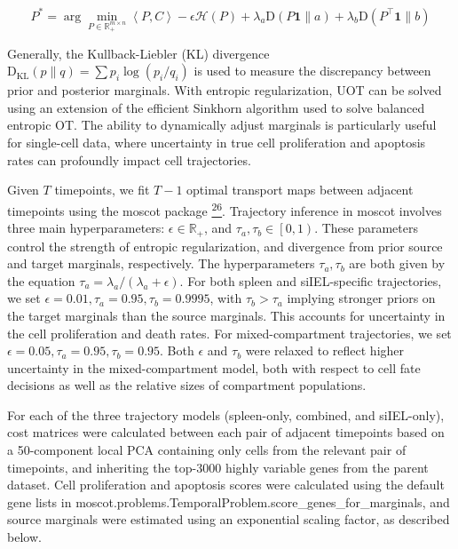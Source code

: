 \[P^{*} = \mathrm{\arg}\underset{P \in \mathbb{R}_{+}^{m \times n}}{\mathrm{\min}}\left\langle P,C \right\rangle - \epsilon\mathcal{H}(P) + \lambda_{a}\mathrm{D}\left( P\mathbf{1} \parallel a \right) + \lambda_{b}\mathrm{D}\left( P^{\top}\mathbf{1} \parallel b \right)\]

Generally, the Kullback-Liebler (KL) divergence
\(\mathrm{D}_{\mathrm{\text{KL}}}\left( p \parallel q \right) = \sum p_{i}\mathrm{\log}(p_{i}/q_{i})\)
is used to measure the discrepancy between prior and posterior
marginals. With entropic regularization, UOT can be solved using an
extension of the efficient Sinkhorn algorithm used to solve balanced
entropic OT. The ability to dynamically adjust marginals is particularly
useful for single-cell data, where uncertainty in true cell
proliferation and apoptosis rates can profoundly impact cell
trajectories.

Given \(T\) timepoints, we fit \(T - 1\) optimal transport maps between
adjacent timepoints using the moscot package
\href{https://sciwheel.com/work/citation?ids=17428135\&pre=\&suf=\&sa=0\&dbf=0}{\textsuperscript{26}}.
Trajectory inference in moscot involves three main hyperparameters:
\(\epsilon \in \mathbb{R}_{+}\), and
\(\tau_{a},\tau_{b} \in \left\lbrack 0,1 \right)\). These parameters
control the strength of entropic regularization, and divergence from
prior source and target marginals, respectively. The hyperparameters
\(\tau_{a},\tau_{b}\) are both given by the equation
\(\tau_{a} = \lambda_{a}/(\lambda_{a} + \epsilon)\). For both spleen and
siIEL-specific trajectories, we set
\(\epsilon = 0.01,\tau_{a} = 0.95,\tau_{b} = 0.9995\), with
\(\tau_{b} > \tau_{a}\) implying stronger priors on the target marginals
than the source marginals. This accounts for uncertainty in the cell
proliferation and death rates. For mixed-compartment trajectories, we
set \(\epsilon = 0.05,\tau_{a} = 0.95,\tau_{b} = 0.95\). Both
\(\epsilon\) and \(\tau_{b}\) were relaxed to reflect higher uncertainty
in the mixed-compartment model, both with respect to cell fate decisions
as well as the relative sizes of compartment populations.

For each of the three trajectory models (spleen-only, combined, and
siIEL-only), cost matrices were calculated between each pair of adjacent
timepoints based on a 50-component local PCA containing only cells from
the relevant pair of timepoints, and inheriting the top-3000 highly
variable genes from the parent dataset. Cell proliferation and apoptosis
scores were calculated using the default gene lists in
moscot.problems.TemporalProblem.score\_genes\_for\_marginals, and source
marginals were estimated using an exponential scaling factor, as
described below.

